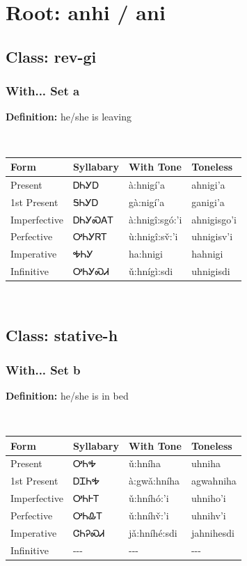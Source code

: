 \section*{Root: anhi / ani}
\subsection*{Class: rev-gi}
\subsubsection*{With... Set a}
\textbf{Definition: } he/she is leaving
\\[0.5em]
\begin{tabularx}{\textwidth}{l X X X}%
\toprule%
\textbf{Form}&\textbf{Syllabary}&\textbf{With Tone}&\textbf{Toneless}\\%
\midrule%
Present&ᎠᏂᎩᎠ&à:hnigí’a&ahnigi’a\\%
1st Present&ᎦᏂᎩᎠ&gà:nigí’a&ganigi’a\\%
Imperfective&ᎠᏂᎩᏍᎪᎢ&à:hnigî:sgó:’i&ahnigisgo’i\\%
Perfective&ᎤᏂᎩᏒᎢ&ù:hnigî:sv̌:’i&uhnigisv’i\\%
Imperative&ᎭᏂᎩ&ha:hnigi&hahnigi\\%
Infinitive&ᎤᏂᎩᏍᏗ&ǔ:hnígì:sdi&uhnigisdi\\%
\bottomrule%
\end{tabularx}
\\[1em]
\subsection*{Class: stative-h}
\subsubsection*{With... Set b}
\textbf{Definition: } he/she is in bed
\\[0.5em]
\begin{tabularx}{\textwidth}{l X X X}%
\toprule%
\textbf{Form}&\textbf{Syllabary}&\textbf{With Tone}&\textbf{Toneless}\\%
\midrule%
Present&ᎤᏂᎭ&ǔ:hníha&uhniha\\%
1st Present&ᎠᏆᏂᎭ&à:gwǎ:hníha&agwahniha\\%
Imperfective&ᎤᏂᎰᎢ&ǔ:hníhó:’i&uhniho’i\\%
Perfective&ᎤᏂᎲᎢ&ǔ:hníhv̌:’i&uhnihv’i\\%
Imperative&ᏣᏂᎮᏍᏗ&jǎ:hníhé:sdi&jahnihesdi\\%
Infinitive&{-}{-}{-}&{-}{-}{-}&{-}{-}{-}\\%
\bottomrule%
\end{tabularx}
\\[1em]